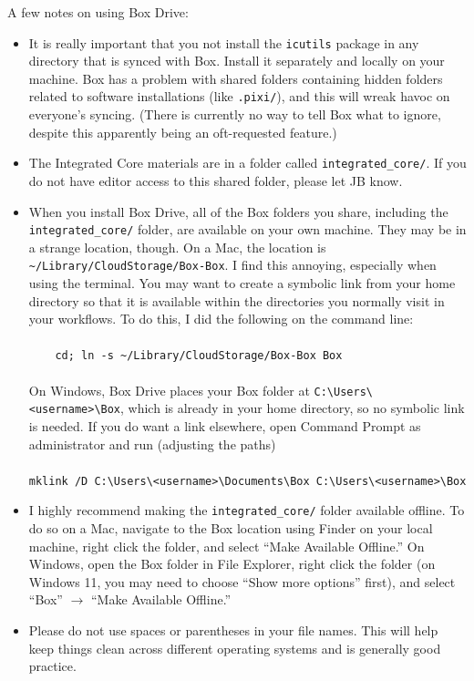 A few notes on using Box Drive:
\begin{itemize}
\item It is really important that you not install the \texttt{icutils} package in any directory that is synced with Box. Install it separately and locally on your machine. Box has a problem with shared folders containing hidden folders related to software installations (like \verb|.pixi/|), and this will wreak havoc on everyone's syncing. (There is currently no way to tell Box what to ignore, despite this apparently being an oft-requested feature.)
\item The Integrated Core materials are in a folder called \verb|integrated_core/|. If you do not have editor access to this shared folder, please let JB know.
\item When you install Box Drive, all of the Box folders you share, including the \verb|integrated_core/| folder, are available on your own machine. They may be in a strange location, though. On a Mac, the location is\\\verb|~/Library/CloudStorage/Box-Box|. I find this annoying, especially when using the terminal. You may want to create a symbolic link from your home directory so that it is available within the directories you normally visit in your workflows. To do this, I did the following on the command line:\\\\
\verb|    cd; ln -s ~/Library/CloudStorage/Box-Box Box|\\\\
On Windows, Box Drive places your Box folder at \verb|C:\Users\<username>\Box|, which is already in your home directory, so no symbolic link is needed. If you do want a link elsewhere, open Command Prompt as administrator and run (adjusting the paths)\\\\
\verb|mklink /D C:\Users\<username>\Documents\Box C:\Users\<username>\Box|
\item I highly recommend making the \verb|integrated_core/| folder available offline. To do so on a Mac, navigate to the Box location using Finder on your local machine, right click the folder, and select ``Make Available Offline.'' On Windows, open the Box folder in File Explorer, right click the folder (on Windows 11, you may need to choose ``Show more options'' first), and select ``Box'' $\to$ ``Make Available Offline.''
\item Please do not use spaces or parentheses in your file names. This will help keep things clean across different operating systems and is generally good practice.
\end{itemize}

